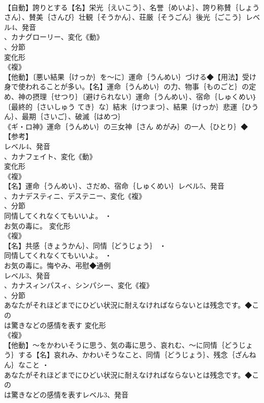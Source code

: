 \documentclass[8pt]{extreport}
\begin{document}
\begin{CJK}{UTF8}{min}
\\	【自動】誇りとする【名】栄光｛えいこう｝、名誉｛めいよ｝、誇り称賛｛しょうさん｝、賛美｛さんび｝壮観｛そうかん｝、荘厳｛そうごん｝後光｛ごこう｝レベル4、発音
\\	、カナグローリー、変化《動》
\\	、分節
\\	変化形 
\\	《複》
\\	【他動】〔悪い結果｛けっか｝を～に〕運命｛うんめい｝づける◆【用法】受け身で使われることが多い。【名】運命｛うんめい｝の力、物事｛ものごと｝の定め、神の摂理｛せつり｝〔避けられない〕運命｛うんめい｝、宿命｛しゅくめい｝〔最終的｛さいしゅう てき｝な〕結末｛けつまつ｝、結果｛けっか｝悲運｛ひうん｝、最期｛さいご｝、破滅｛はめつ｝
\\	《ギ・ロ神》運命｛うんめい｝の三女神｛さん めがみ｝の一人｛ひとり｝◆【参考】
\\	レベル4、発音
\\	、カナフェイト、変化《動》
\\	変化形 
\\	《複》
\\	【名】運命｛うんめい｝、さだめ、宿命｛しゅくめい｝レベル5、発音
\\	、カナデスティニ、デステニー、変化《複》
\\	、分節
\\	同情してくれなくてもいいよ。 ・
\\	お気の毒に。	変化形 
\\	《複》
\\	【名】共感｛きょうかん｝、同情｛どうじょう｝ ・
\\	同情してくれなくてもいいよ。 ・
\\	お気の毒に。悔やみ、弔慰◆通例
\\	レベル3、発音
\\	、カナスィンパスィ、シンパシー、変化《複》
\\	、分節
\\	あなたがそれほどまでにひどい状況に耐えなければならないとは残念です。◆この
\\	は驚きなどの感情を表す	変化形 
\\	《複》
\\	【他動】～をかわいそうに思う、気の毒に思う、哀れむ、～に同情｛どうじょう｝する【名】哀れみ、かわいそうなこと、同情｛どうじょう｝、残念｛ざんねん｝なこと ・
\\	あなたがそれほどまでにひどい状況に耐えなければならないとは残念です。◆この
\\	は驚きなどの感情を表すレベル3、発音

\end{CJK}
\end{document}

